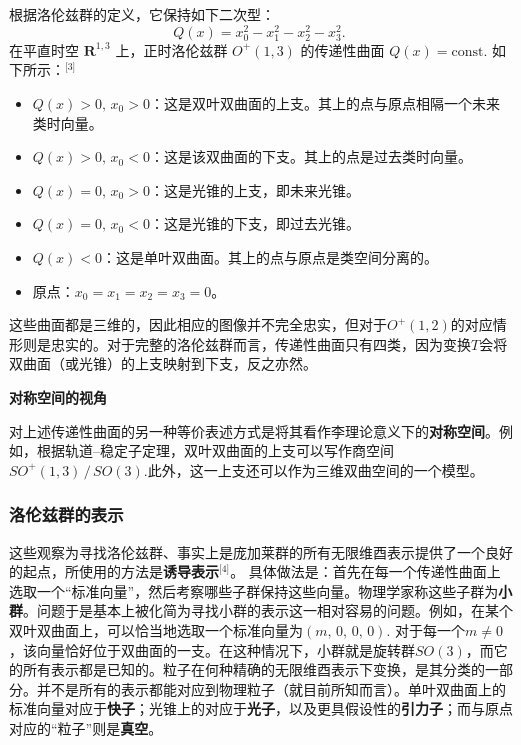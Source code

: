 根据洛伦兹群的定义，它保持如下二次型：
\[
Q(x) = x_{0}^{2} - x_{1}^{2} - x_{2}^{2} - x_{3}^{2}.~
\]
在平直时空 $\mathbf{R}^{1,3}$ 上，正时洛伦兹群 $O^{+}(1,3)$ 的传递性曲面 $Q(x)=\text{const.}$ 如下所示：\(^\text{[3]}\)
\begin{itemize}
  \item $Q(x) > 0,\, x_{0} > 0$：这是双叶双曲面的上支。其上的点与原点相隔一个未来类时向量。
  \item $Q(x) > 0,\, x_{0} < 0$：这是该双曲面的下支。其上的点是过去类时向量。
  \item $Q(x) = 0,\, x_{0} > 0$：这是光锥的上支，即未来光锥。
  \item $Q(x) = 0,\, x_{0} < 0$：这是光锥的下支，即过去光锥。
  \item $Q(x) < 0$：这是单叶双曲面。其上的点与原点是类空间分离的。
  \item 原点：$x_{0} = x_{1} = x_{2} = x_{3} = 0$。
\end{itemize}
这些曲面都是三维的，因此相应的图像并不完全忠实，但对于$O^{+}(1,2)$的对应情形则是忠实的。对于完整的洛伦兹群而言，传递性曲面只有四类，因为变换$T$会将双曲面（或光锥）的上支映射到下支，反之亦然。

\textbf{对称空间的视角}

对上述传递性曲面的另一种等价表述方式是将其看作李理论意义下的\textbf{对称空间}。例如，根据轨道–稳定子定理，双叶双曲面的上支可以写作商空间$SO^{+}(1,3) \,/\, SO(3)$.此外，这一上支还可以作为三维双曲空间的一个模型。
\subsubsection{洛伦兹群的表示}
这些观察为寻找洛伦兹群、事实上是庞加莱群的所有无限维酉表示提供了一个良好的起点，所使用的方法是\textbf{诱导表示}\(^\text{[4]}\)。  具体做法是：首先在每一个传递性曲面上选取一个“标准向量”，然后考察哪些子群保持这些向量。物理学家称这些子群为\textbf{小群}。问题于是基本上被化简为寻找小群的表示这一相对容易的问题。例如，在某个双叶双曲面上，可以恰当地选取一个标准向量为$(m,\, 0,\, 0,\, 0)$.
对于每一个$m \neq 0$，该向量恰好位于双曲面的一支。在这种情况下，小群就是旋转群$SO(3)$，而它的所有表示都是已知的。粒子在何种精确的无限维酉表示下变换，是其分类的一部分。并不是所有的表示都能对应到物理粒子（就目前所知而言）。单叶双曲面上的标准向量对应于\textbf{快子}；光锥上的对应于\textbf{光子}，以及更具假设性的\textbf{引力子}；而与原点对应的“粒子”则是\textbf{真空}。
